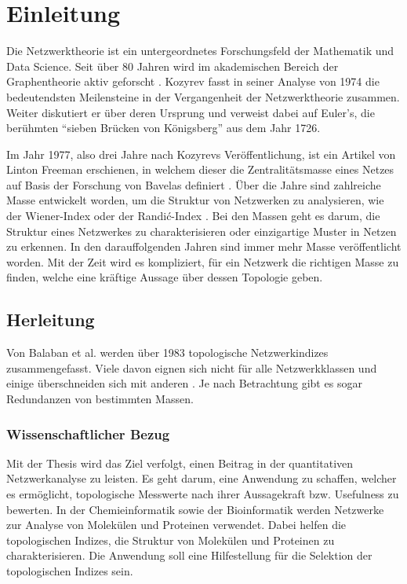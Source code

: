 \chapter{Einleitung} \label{chap:introduction}

Die Netzwerktheorie ist ein untergeordnetes Forschungsfeld der Mathematik und Data Science.
Seit über 80 Jahren wird im akademischen Bereich der Graphentheorie aktiv geforscht \cite{kozyrev_graph_1974,bavelas_alex_1948}.
Kozyrev fasst in seiner Analyse von 1974 die bedeutendsten Meilensteine in der Vergangenheit der Netzwerktheorie zusammen.
Weiter diskutiert er über deren Ursprung und verweist dabei auf Euler’s, die berühmten \enquote{sieben Brücken von Königsberg} aus dem Jahr 1726.

Im Jahr 1977, also drei Jahre nach Kozyrevs Veröffentlichung, ist ein Artikel von Linton Freeman erschienen, in welchem dieser die Zentralitätsmasse eines Netzes auf Basis der Forschung von Bavelas definiert \cite{freeman_set_1977,bavelas_alex_1948}.
Über die Jahre sind zahlreiche Masse entwickelt worden, um die Struktur von Netzwerken zu analysieren, wie der Wiener-Index \cite{wiener_structural_1947} oder der Randić-Index \cite{randic_characterization_1975}.
Bei den Massen geht es darum, die Struktur eines Netzwerkes zu charakterisieren oder einzigartige Muster in Netzen zu erkennen. In den darauffolgenden Jahren sind immer mehr Masse veröffentlicht worden.
Mit der Zeit wird es kompliziert, für ein Netzwerk die richtigen Masse zu finden, welche eine kräftige Aussage über dessen Topologie geben.

\section{Herleitung}

Von Balaban et al. \cite{balaban_1983_2014} werden über 1983 topologische Netzwerkindizes zusammengefasst.
Viele davon eignen sich nicht für alle Netzwerkklassen und einige überschneiden sich mit anderen \cite{balaban_highly_1982,kraus_probabilistic_2014,gomes_combination_2019}.
Je nach Betrachtung gibt es sogar Redundanzen von bestimmten Massen.



\subsection{Wissenschaftlicher Bezug}

Mit der Thesis wird das Ziel verfolgt, einen Beitrag in der quantitativen Netzwerkanalyse zu leisten. 
Es geht darum, eine Anwendung zu schaffen, welcher es ermöglicht, topologische Messwerte nach ihrer Aussagekraft bzw. Usefulness zu bewerten.
In der Chemieinformatik sowie der Bioinformatik werden Netzwerke zur Analyse von Molekülen und Proteinen verwendet.
Dabei helfen die topologischen Indizes, die Struktur von Molekülen und Proteinen zu charakterisieren.
Die Anwendung soll eine Hilfestellung für die Selektion der topologischen Indizes sein.

